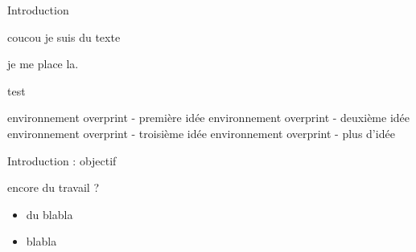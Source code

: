 \begin{frame}{Introduction}

coucou je suis du texte
\pause %

je me place la.

\end{frame}

\begin{frame}{test}
	 \begin{overprint}
		 environnement overprint - première idée
		\onslide<2> environnement overprint - deuxième idée
		\onslide<3> environnement overprint - troisième idée
		\onslide<4> environnement overprint - plus d'idée
	\end{overprint} 
\end{frame}

\begin{frame}{Introduction : objectif}

encore du travail ?

\begin{itemize}
    \item du blabla
    \item blabla
\end{itemize}

\end{frame}
